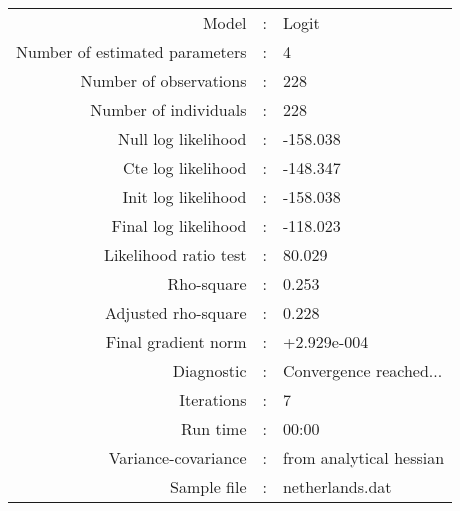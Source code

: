 

\begin{flushleft}
\begin{tabular}{rcl}
\hline
Model &:& Logit\\
Number of estimated parameters&:&4\\
Number of  observations &:& 228\\
Number of individuals&:&228\\
Null log likelihood&:&-158.038\\
Cte log likelihood&:&-148.347\\
Init log likelihood&:&-158.038\\
Final log likelihood&:&-118.023\\
Likelihood ratio test &:&80.029\\
Rho-square&:&0.253\\
Adjusted rho-square&:&0.228\\
Final gradient norm&:&+2.929e-004\\
Diagnostic&:&Convergence reached...\\
Iterations&:&7\\
Run time&:&00:00\\
Variance-covariance&:&from analytical hessian
\\
Sample file&:&netherlands.dat\\
\end{tabular}
\end{flushleft}
